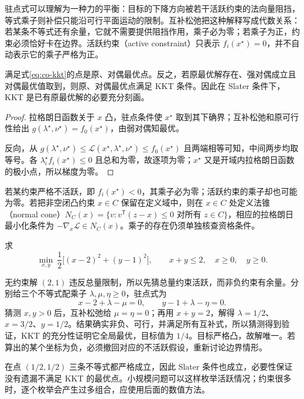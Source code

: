 \documentclass[UTF8,12pt,a4paper,fontset=fandol]{ctexbook}
\begin{document}
驻点式可以理解为一种力的平衡：目标的下降方向被若干活跃约束的法向量阻挡，等式乘子则补偿只能沿可行平面运动的限制。互补松弛把这种解释写成代数关系：若某条不等式还有余量，它就不需要提供阻挡作用，乘子必为零；若乘子为正，约束必须恰好卡在边界。活跃约束（active constraint）只表示 $f_i(x^\star)=0$，并不自动表示它的乘子严格为正。

\begin{theorem}
满足式\eqref{eq:co-kkt}的点是原、对偶最优点。反之，若原最优解存在、强对偶成立且对偶最优值取到，则原、对偶最优点满足 KKT 条件。因此在 Slater 条件下，KKT 是已有原最优解的必要充分刻画。
\end{theorem}
\begin{proof}
拉格朗日函数关于 $x$ 凸，驻点条件使 $x^\star$ 取到其下确界；互补松弛和原可行性给出 $g(\lambda^\star,\nu^\star)=f_0(x^\star)$，由弱对偶知最优。

反向，从 $g(\lambda^\star,\nu^\star)\leq\mathcal L(x^\star,\lambda^\star,\nu^\star)\leq f_0(x^\star)$ 且两端相等可知，中间两步均取等号。各 $\lambda_i^\star f_i(x^\star)\leq0$ 且总和为零，故逐项为零；$x^\star$ 又是开域内拉格朗日函数的极小点，所以梯度为零。
\end{proof}

若某约束严格不活跃，即 $f_i(x^\star)<0$，其乘子必为零；活跃约束的乘子却也可能为零。若把非空闭凸约束 $x\in C$ 保留在定义域中，则在 $x\in C$ 处定义法锥（normal cone）$N_C(x)=\{v:v^{\mathsf T}(z-x)\leq0\text{ 对所有 }z\in C\}$，相应的拉格朗日最小化条件为 $-\nabla_x\mathcal L\in N_C(x)$。乘子的存在仍须单独核查资格条件。

\begin{example}
\label{ex:co-active-constraints}
求
\[
 \min_{x,y}\ \frac12\bigl[(x-2)^2+(y-1)^2\bigr],
 \qquad x+y\leq2,\quad x\geq0,\quad y\geq0.
\]
\end{example}
\begin{solve}
无约束解 $(2,1)$ 违反总量限制，所以先猜总量约束活跃，而非负约束有余量。分别给三个不等式配乘子 $\lambda,\mu,\eta\geq0$，驻点式为
\[
 x-2+\lambda-\mu=0,\qquad
 y-1+\lambda-\eta=0.
\]
猜测 $x,y>0$ 后，互补松弛给 $\mu=\eta=0$；再用 $x+y=2$，解得 $\lambda=1/2$、$x=3/2$、$y=1/2$。结果确实非负、可行，并满足所有互补式，所以猜测得到验证，KKT 的充分性证明它全局最优，目标值为 $1/4$。目标严格凸，故解唯一。若算出的某个坐标为负，必须撤回对应的不活跃假设，重新讨论边界情形。

在点 $(1/2,1/2)$ 三条不等式都严格成立，因此 Slater 条件也成立，必要性保证没有遗漏不满足 KKT 的最优点。小规模问题可以这样枚举活跃情况；约束很多时，逐个枚举会产生过多组合，应使用后面的数值方法。
\end{solve}
\end{document}
